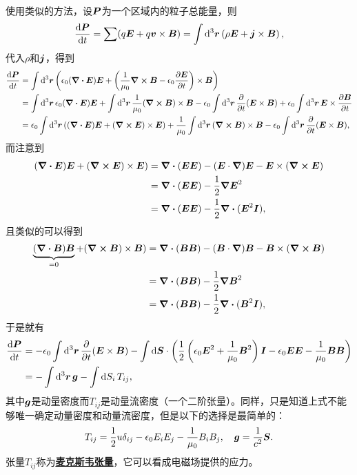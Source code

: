 \documentclass[UTF8, a4paper]{ctexart}
\newcommand*{\concept}[1]{\underline{\textbf{#1}}}
\begin{document}
使用类似的方法，设$\vb*{P}$为一个区域内的粒子总能量，则
\[
    \dv{\vb*{P}}{t} = \sum (q \vb*{E} + q \vb*{v} \times \vb*{B}) = \int \dd[3]{\vb*{r}} \left( \rho \vb*{E} + \vb*{j} \times \vb*{B} \right),
\]
代入$\rho$和$\vb*{j}$，得到
\[
    \begin{aligned}
        \dv{\vb*{P}}{t} &= \int \dd[3]{\vb*{r}} \left(\epsilon_0 (\div{\vb*{E}}) \vb*{E} + \left( \frac{1}{\mu_0} \curl{\vb*{B}} - \epsilon_0 \pdv{\vb*{E}}{t} \right) \times \vb*{B} \right) \\
        &= \int \dd[3]{\vb*{r}} \epsilon_0 (\div{\vb*{E}}) \vb*{E} + \int \dd[3]{\vb*{r}} \frac{1}{\mu_0} (\curl{\vb*{B}}) \times \vb*{B} - \epsilon_0 \int \dd[3]{\vb*{r}} \pdv{t} (\vb*{E} \times \vb*{B}) + \epsilon_0 \int \dd[3]{\vb*{r}} \vb*{E} \times \pdv{\vb*{B}}{t} \\
        &= \epsilon_0 \int \dd[3]{\vb*{r}} ((\div{\vb*{E}}) \vb*{E} + (\curl{\vb*{E}}) \times \vb*{E}) + \frac{1}{\mu_0} \int \dd[3]{\vb*{r}} (\curl{\vb*{B}}) \times \vb*{B} - \epsilon_0 \int \dd[3]{\vb*{r}} \pdv{t} (\vb*{E} \times \vb*{B}),
    \end{aligned}
\]
而注意到
\[
    \begin{aligned}
        (\div{\vb*{E}}) \vb*{E} + (\curl{\vb*{E}}) \times \vb*{E}) &= \div{(\vb*{E} \vb*{E})} - (\vb*{E} \cdot \grad) \vb*{E} - \vb*{E} \times (\curl{\vb*{E}}) \\
        &= \div{(\vb*{E} \vb*{E})} - \frac{1}{2} \grad{\vb*{E}^2} \\
        &= \div{(\vb*{E} \vb*{E})} - \frac{1}{2} \div{(\vb*{E}^2 \vb*{I})},
    \end{aligned}
\]
且类似的可以得到
\[
    \begin{aligned}
        \underbrace{(\div{\vb*{B}}) \vb*{B}}_{=0} + (\curl{\vb*{B}}) \times \vb*{B}) &= \div{(\vb*{B} \vb*{B})} - (\vb*{B} \cdot \grad) \vb*{B} - \vb*{B} \times (\curl{\vb*{B}}) \\
        &= \div{(\vb*{B} \vb*{B})} - \frac{1}{2} \grad{\vb*{B}^2} \\
        &= \div{(\vb*{B} \vb*{B})} - \frac{1}{2} \div{(\vb*{B}^2 \vb*{I})},
    \end{aligned}
\]
于是就有
\[
    \begin{aligned}
        \dv{\vb*{P}}{t} &= - \epsilon_0 \int \dd[3]{\vb*{r}} \pdv{t} (\vb*{E} \times \vb*{B}) - \int \dd{\vb*{S}} \cdot \left( \frac{1}{2} \left( \epsilon_0 \vb*{E}^2 + \frac{1}{\mu_0} \vb*{B}^2 \right) \vb*{I} - \epsilon_0 \vb*{E} \vb*{E} - \frac{1}{\mu_0} \vb*{B} \vb*{B} \right) \\
        &= - \int \dd[3]{\vb*{r}} \vb*{g} - \int \dd{S_i} T_{ij},
    \end{aligned}
\]
其中$\vb*{g}$是动量密度而$T_{ij}$是动量流密度（一个二阶张量）。同样，只是知道上式不能够唯一确定动量密度和动量流密度，但是以下的选择是最简单的：
\begin{equation}
    T_{ij} = \frac{1}{2} u \delta_{ij} - \epsilon_0 E_i E_j - \frac{1}{\mu_0} B_i B_j, \quad \vb*{g} = \frac{1}{c^2} \vb*{S}.
\end{equation}
张量$T_{ij}$称为\concept{麦克斯韦张量}，它可以看成电磁场提供的应力。
\end{document}
